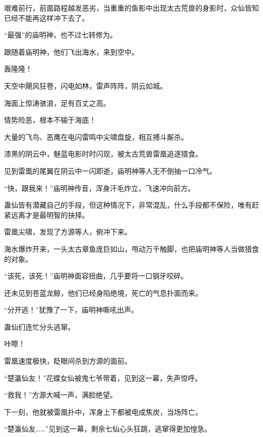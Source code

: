 \begin{this_body}
艰难前行，前面路程越发恶劣，当重重的鱼影中出现太古荒兽的身影时，众仙皆知已经不能再这样冲下去了。

“最强”的庙明神，也不过七转修为。

跟随着庙明神，他们飞出海水，来到空中。

轰隆隆！

天空中飓风狂卷，闪电如林，雷声阵阵，阴云如城。

海面上惊涛骇浪，足有百丈之高。

情势险恶，根本不输于海底！

大量的飞鸟、恶鹰在电闪雷鸣中尖啸盘旋，相互搏斗厮杀。

漆黑的阴云中，魅蓝电影时时闪现，被太古荒兽雷凰追逐猎食。

见到雷凰的尾翼在阴云中一闪即逝，庙明神等人无不倒抽一口冷气。

“快，跟我来！”庙明神传音，浑身汗毛炸立，飞速冲向前方。

蛊仙皆有潜藏自己的手段，但这种情况下，非常混乱，什么手段都不保险，唯有赶紧远离才是最明智的抉择。

雷凰尖啸，发现了方源等人，俯冲下来。

海水爆炸开来，一头太古章鱼庞巨如山，甩动万千触脚，也把庙明神等人当做猎食的对象。

“该死，该死！”庙明神面容扭曲，几乎要将一口钢牙咬碎。

还未见到苍蓝龙鲸，他们已经身陷绝境，死亡的气息扑面而来。

“分开逃！”犹豫了一下，庙明神嘶吼出声。

蛊仙们连忙分头逃窜。

咔嚓！

雷凰速度极快，眨眼间杀到方源的面前。

“楚瀛仙友！”花蝶女仙被鬼七爷带着，见到这一幕，失声惊呼。

“救我！”方源大喊一声，满脸绝望。

下一刻，他就被雷凰扑中，浑身上下都被电成焦炭，当场阵亡。

“楚瀛仙友……”见到这一幕，剩余七仙心头狂跳，逃窜得更加惶急。

\end{this_body}

